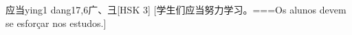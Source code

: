 \begin{EntryWithPhonetic}{应当}{ying1 dang1}{7,6}{⼴、⼹}[HSK 3]
  [学生们应当努力学习。===Os alunos devem se esforçar nos estudos.]
\end{EntryWithPhonetic}

